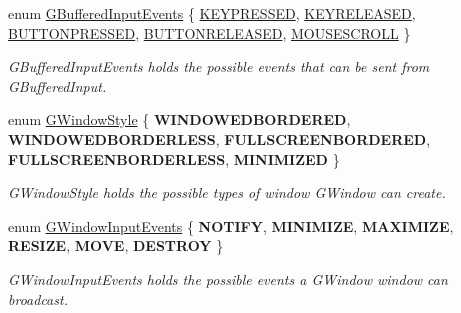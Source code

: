 \begin{DoxyCompactItemize}
\item 
enum \hyperlink{namespaceGW_1_1SYSTEM_a309fd3a92512dd2bfa8065d99c0d7fcb}{G\+Buffered\+Input\+Events} \{ \newline
\hyperlink{namespaceGW_1_1SYSTEM_a309fd3a92512dd2bfa8065d99c0d7fcbaf8bb58b0791c2d5d33b224213327f960}{K\+E\+Y\+P\+R\+E\+S\+S\+ED}, 
\hyperlink{namespaceGW_1_1SYSTEM_a309fd3a92512dd2bfa8065d99c0d7fcbabb708a216e7e8ef33cc542e6def7a688}{K\+E\+Y\+R\+E\+L\+E\+A\+S\+ED}, 
\hyperlink{namespaceGW_1_1SYSTEM_a309fd3a92512dd2bfa8065d99c0d7fcba56314f1a5b4d09751ed354a45a3a78fb}{B\+U\+T\+T\+O\+N\+P\+R\+E\+S\+S\+ED}, 
\hyperlink{namespaceGW_1_1SYSTEM_a309fd3a92512dd2bfa8065d99c0d7fcba9f7d6e613de276b27e471cd30eac08de}{B\+U\+T\+T\+O\+N\+R\+E\+L\+E\+A\+S\+ED}, 
\newline
\hyperlink{namespaceGW_1_1SYSTEM_a309fd3a92512dd2bfa8065d99c0d7fcbae4066728a571d6456cf5def5742a92bf}{M\+O\+U\+S\+E\+S\+C\+R\+O\+LL}
 \}\begin{DoxyCompactList}\small\item\em G\+Buffered\+Input\+Events holds the possible events that can be sent from G\+Buffered\+Input. \end{DoxyCompactList}
\item 
\mbox{\label{namespaceGW_1_1SYSTEM_ad117891e556631f842625c348d36a071}} 
enum \hyperlink{namespaceGW_1_1SYSTEM_ad117891e556631f842625c348d36a071}{G\+Window\+Style} \{ \newline
{\bfseries W\+I\+N\+D\+O\+W\+E\+D\+B\+O\+R\+D\+E\+R\+ED}, 
{\bfseries W\+I\+N\+D\+O\+W\+E\+D\+B\+O\+R\+D\+E\+R\+L\+E\+SS}, 
{\bfseries F\+U\+L\+L\+S\+C\+R\+E\+E\+N\+B\+O\+R\+D\+E\+R\+ED}, 
{\bfseries F\+U\+L\+L\+S\+C\+R\+E\+E\+N\+B\+O\+R\+D\+E\+R\+L\+E\+SS}, 
\newline
{\bfseries M\+I\+N\+I\+M\+I\+Z\+ED}
 \}\begin{DoxyCompactList}\small\item\em G\+Window\+Style holds the possible types of window G\+Window can create. \end{DoxyCompactList}
\item 
\mbox{\label{namespaceGW_1_1SYSTEM_a7d3a00c7f94541cb6f446fde944ab309}} 
enum \hyperlink{namespaceGW_1_1SYSTEM_a7d3a00c7f94541cb6f446fde944ab309}{G\+Window\+Input\+Events} \{ \newline
{\bfseries N\+O\+T\+I\+FY}, 
{\bfseries M\+I\+N\+I\+M\+I\+ZE}, 
{\bfseries M\+A\+X\+I\+M\+I\+ZE}, 
{\bfseries R\+E\+S\+I\+ZE}, 
\newline
{\bfseries M\+O\+VE}, 
{\bfseries D\+E\+S\+T\+R\+OY}
 \}\begin{DoxyCompactList}\small\item\em G\+Window\+Input\+Events holds the possible events a G\+Window window can broadcast. \end{DoxyCompactList}
\end{DoxyCompactItemize}
